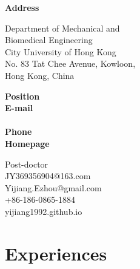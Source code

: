 \documentclass[11pt]{moderncv}
\begin{document}
\begin{CJK*}{GBK}{kai}
 \cnname{\hspace{0.2em}\color{blue}{Yi Jiang}}
 \maketitle
\vspace{-12mm}

\parbox[t]{2.4cm}{
                \textbf{Address}\\
                \textbf{}}
\parbox[t]{6.5cm}{Department of Mechanical and \\
                 Biomedical Engineering \\
                City University of Hong Kong\\
                No. 83 Tat Chee Avenue, Kowloon,\\
                Hong Kong, China}
\parbox[t]{2.5cm}{
               \textbf{Position}\\
               \textbf{E-mail}\\
               \\
               \textbf{Phone}\\
               \textbf{Homepage}\\
               }
\parbox[t]{6.5cm}{
               Post-doctor \\
               JY369356904@163.com\\
               Yijiang.Ezhou@gmail.com\\
               +86-186-0865-1884\\
               yijiang1992.github.io
               }
\vspace{3mm}

\section{Experiences}


\end{CJK*}
\end{document}

